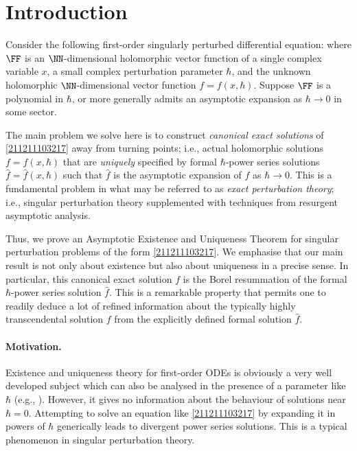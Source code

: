 \documentclass[11pt]{article}
\begin{document}
\section{Introduction}

Consider the following first-order singularly perturbed differential equation:
where $\FF$ is an $\NN$-dimensional holomorphic vector function of a single complex variable $x$, a small complex perturbation parameter $\hbar$, and the unknown holomorphic $\NN$-dimensional vector function $f = f(x,\hbar)$.
Suppose $\FF$ is a polynomial in $\hbar$, or more generally admits an asymptotic expansion as $\hbar \to 0$ in some sector.

The main problem we solve here is to construct \textit{canonical exact solutions} of \eqref{211211103217} away from turning points; i.e., actual holomorphic solutions $f = f (x,\hbar)$ that are \textit{uniquely} specified by formal $\hbar$-power series solutions $\hat{f} = \hat{f} (x,\hbar)$ such that $\hat{f}$ is the asymptotic expansion of $f$ as $\hbar \to 0$.
This is a fundamental problem in what may be referred to as \textit{exact perturbation theory}; i.e., singular perturbation theory supplemented with techniques from resurgent asymptotic analysis.

Thus, we prove an Asymptotic Existence and Uniqueness Theorem for singular perturbation problems of the form \eqref{211211103217}.
We emphasise that our main result is not only about existence but also about uniqueness in a precise sense.
In particular, this canonical exact solution $f$ is the Borel resummation of the formal $\hbar$-power series solution $\hat{f}$.
This is a remarkable property that permits one to readily deduce a lot of refined information about the typically highly transcendental solution $f$ from the explicitly defined formal solution $\hat{f}$.

\paragraph{Motivation.}
Existence and uniqueness theory for first-order ODEs is obviously a very well developed subject which can also be analysed in the presence of a parameter like $\hbar$ (e.g., \cite[Theorem 24.1]{MR0460820}).
However, it gives no information about the behaviour of solutions near $\hbar = 0$.
Attempting to solve an equation like \eqref{211211103217} by expanding it in powers of $\hbar$ generically leads to divergent power series solutions.
This is a typical phenomenon in singular perturbation theory.
\end{document}
